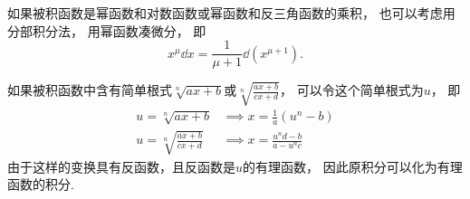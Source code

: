 如果被积函数是幂函数和对数函数或幂函数和反三角函数的乘积，
也可以考虑用分部积分法，
用幂函数凑微分，
即\begin{equation*}
	x^\mu \dd{x} = \frac1{\mu+1} \dd(x^{\mu+1}).
\end{equation*}


如果被积函数中含有简单根式\(\sqrt[n]{ax+b}\)或\(\sqrt[n]{\frac{ax+b}{cx+d}}\)，
可以令这个简单根式为\(u\)，
即\begin{align*}
	u=\sqrt[n]{ax+b} &\implies x=\frac{1}{a}(u^n-b) \\
	u=\sqrt[n]{\frac{ax+b}{cx+d}} &\implies x=\frac{u^nd-b}{a-u^nc}
\end{align*}
由于这样的变换具有反函数，且反函数是\(u\)的有理函数，
因此原积分可以化为有理函数的积分.
